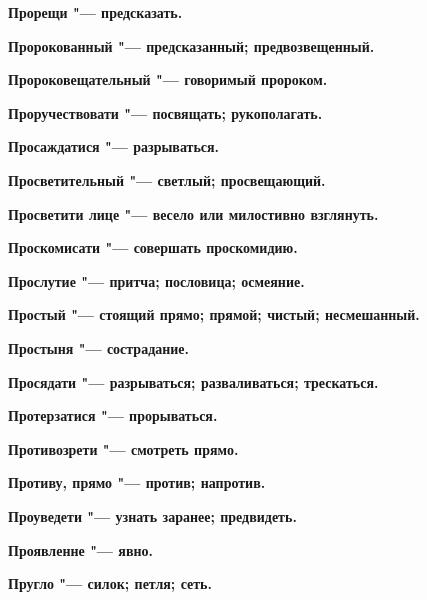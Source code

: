 \begin{multicols}{2}
\bfseries Прорещи\normalfont{} "--- предсказать. 




\bfseries Пророкованный\normalfont{} "--- предсказанный; предвозвещенный. 




\bfseries Пророковещательный\normalfont{} "--- говоримый пророком. 




\bfseries Проручествовати\normalfont{} "--- посвящать; рукополагать. 




\bfseries Просаждатися\normalfont{} "--- разрываться. 




\bfseries Просветительный\normalfont{} "--- светлый; просвещающий. 




\bfseries Просветити лице\normalfont{} "--- весело или милостивно взглянуть. 




\bfseries Проскомисати\normalfont{} "--- совершать проскомидию. 




\bfseries Прослутие\normalfont{} "--- притча; пословица; осмеяние. 




\bfseries Простый\normalfont{} "--- стоящий прямо; прямой; чистый; несмешанный. 




\bfseries Простыня\normalfont{} "--- сострадание. 




\bfseries Просядати\normalfont{} "--- разрываться; разваливаться; трескаться. 




\bfseries Протерзатися\normalfont{} "--- прорываться. 




\bfseries Противозрети\normalfont{} "--- смотреть прямо. 




\bfseries Противу, прямо\normalfont{} "--- против; напротив. 




\bfseries Проуведети\normalfont{} "--- узнать заранее; предвидеть. 




\bfseries Проявленне\normalfont{} "--- явно. 




\bfseries Пругло\normalfont{} "--- силок; петля; сеть. 





\end{multicols}

